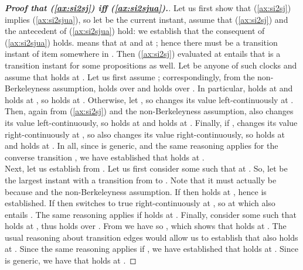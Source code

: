 \documentclass[a4paper]{article}
\newcommand{\frf}[1]{(\ref{#1})}
\theoremstyle{plain}
\theoremstyle{definition}
\begin{document}
\begin{proof}[\textbf{Proof that \frf{ax:si2sj} iff \frf{ax:si2sjua}.}]
Let us first show that \frf{ax:si2sj} implies \frf{ax:si2sjua}, so let  be the current instant, assume that \frf{ax:si2sj} and the antecedent  of \frf{ax:si2sjua} hold: we establish that the consequent of \frf{ax:si2sjua} holds.
 means that  at  and  at ; hence there must be a transition instant  of item  somewhere in .
Then \frf{ax:si2sj} evaluated at  entails that  is a transition instant for some propositions  as well.
Let  be anyone of such clocks and assume that  holds at .
Let us first assume ; correspondingly, from the non-Berkeleyness assumption,  holds over  and  holds over .
In particular,  holds at  and  holds at , so  holds at .
Otherwise, let , so  changes its value left-continuously at .
Then, again from \frf{ax:si2sj} and the non-Berkeleyness assumption,  also changes its value left-continuously, so  holds at  and  holds at .
Finally, if ,  changes its value right-continuously at , so  also changes its value right-continuously, so  holds at  and  holds at .
In all, since  is generic, and the same reasoning applies for the converse transition , we have established that  holds at . \\
Next, let us establish  from .
Let us first consider some  such that  at .
So, let  be the largest instant with a transition from  to .
Note that it must actually be  because  and the non-Berkeleyness assumption.
If  then  holds at , hence  is established.
If  then  switches to true right-continuously at , so  at  which also entails .
The same reasoning applies if  holds at .
Finally, consider some  such that  holds at , thus  holds over .
From  we have  so , which shows that  holds at .
The usual reasoning about transition edges would allow us to establish that also  holds at .
Since the same reasoning applies if , we have established that  holds at .
Since  is generic, we have that  holds at .


\end{proof}
\end{document}
